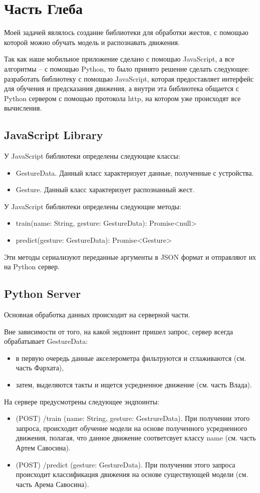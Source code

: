 \section{Часть Глеба}

Моей задачей являлось создание библиотеки для обработки жестов, с помощью которой можно обучать модель и распознавать движения.

Так как наше мобильное приложение сделано с помощью JavaScript, а все алгоритмы – с помощью Python, то было принято решение сделать следующее: разработать библиотеку с помощью JavaScript, которая предоставляет интерфейс для обучения и предсказания движения, а внутри эта библиотека общается с Python сервером с помощью протокола http, на котором уже происходят все вычисления.

\subsection{JavaScript Library}
У JavaScript библиотеки определены следующие классы:
\begin{itemize}
  \item GestureData. Данный класс характеризует данные, полученные с устройства.
  \item Gesture. Данный класс характеризует распознанный жест.
\end{itemize}
У JavaScript библиотеки определены следующие методы:
\begin{itemize}
  \item train(name: String, gesture: GestureData): Promise<null> {} 
  \item predict(gesture: GestureData): Promise<Gesture> {}
\end{itemize}
Эти методы сериализуют переданные аргументы в JSON формат и отправляют их на Python сервер.

\subsection{Python Server}
Основная обработка данных происходит на серверной части.

Вне зависимости от того, на какой эндпоинт пришел запрос, сервер всегда обрабатывает GestureData:
\begin{itemize}
  \item в первую очередь данные акселерометра фильтруются и сглаживаются (см. часть Фархата),
  \item затем, выделяются такты и ищется усредненное движение (см. часть Влада).
\end{itemize}

На сервере предусмотрены следующее эндпоинты:
\begin{itemize}
  \item (POST) /train (name: String, gesture: GestrureData). При получении этого запроса, происходит обучение модели на основе полученного усредненного движения, полагая, что данное движение соответсвует классу name (см. часть Артем Савосина).

  \item (POST) /predict (gesture: GestureData). При получении этого запроса происходит классификация движения на основе существующей модели (см. часть Арема Савосина).
\end{itemize}